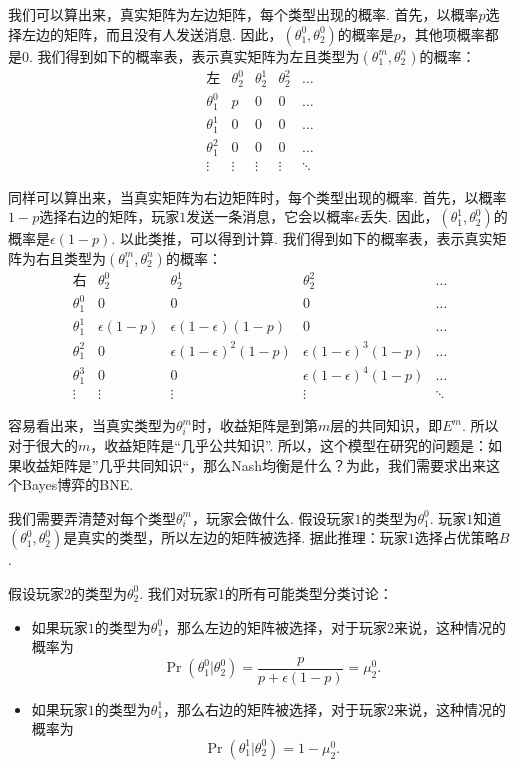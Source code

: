我们可以算出来，真实矩阵为左边矩阵，每个类型出现的概率. 首先，以概率$p$选择左边的矩阵，而且没有人发送消息. 因此，$(\theta_1^0,\theta_2^0)$的概率是$p$，其他项概率都是$0$. 我们得到如下的概率表，表示真实矩阵为左且类型为$(\theta_1^m,\theta_2^n)$的概率：
\[\begin{array}{c|cccc}
\text{左}& \theta_2^0 & \theta_2^1 & \theta_2^2 & \dots \\
\hline
\theta_1^0 & p & 0 & 0 & \dots \\
\theta_1^1 & 0 & 0 & 0 & \dots \\
\theta_1^2 & 0 & 0 & 0 & \dots \\
\vdots & \vdots & \vdots & \vdots & \ddots
\end{array}
\]

同样可以算出来，当真实矩阵为右边矩阵时，每个类型出现的概率. 首先，以概率$1 - p$选择右边的矩阵，玩家$1$发送一条消息，它会以概率$\epsilon$丢失. 因此，$(\theta_1^1,\theta_2^0)$的概率是$\epsilon(1 - p)$. 以此类推，可以得到计算. 我们得到如下的概率表，表示真实矩阵为右且类型为$(\theta_1^m,\theta_2^n)$的概率：
\[
\begin{array}{c|cccc}
\text{右} & \theta_2^0 & \theta_2^1 & \theta_2^2 & \dots \\
\hline
\theta_1^0 & 0 & 0 & 0 & \dots \\
\theta_1^1 & \epsilon(1 - p) & \epsilon(1 - \epsilon)(1 - p) & 0 & \dots \\
\theta_1^2 & 0 & \epsilon(1 - \epsilon)^2(1 - p) & \epsilon(1 - \epsilon)^3(1 - p) & \dots \\
\theta_1^3 & 0 & 0 & \epsilon(1 - \epsilon)^4(1 - p) & \dots \\
\vdots & \vdots & \vdots & \vdots & \ddots
\end{array}
\]


容易看出来，当真实类型为$\theta_i^m$时，收益矩阵是到第$m$层的共同知识，即$E^m$. 所以对于很大的$m$，收益矩阵是“几乎公共知识”. 所以，这个模型在研究的问题是：如果收益矩阵是”几乎共同知识“，那么Nash均衡是什么？为此，我们需要求出来这个Bayes博弈的BNE.

我们需要弄清楚对每个类型$\theta_i^m$，玩家会做什么. 假设玩家$1$的类型为$\theta_1^0$. 玩家$1$知道$(\theta_1^0,\theta_2^0)$是真实的类型，所以左边的矩阵被选择. 据此推理：玩家$1$选择占优策略$B$.

假设玩家$2$的类型为$\theta_2^0$. 我们对玩家$1$的所有可能类型分类讨论：
\begin{itemize}
    \item 如果玩家$1$的类型为$\theta_1^0$，那么左边的矩阵被选择，对于玩家$2$来说，这种情况的概率为
    \[\Pr(\theta_1^0|\theta_2^0) = \frac{p}{p+\epsilon(1-p)} = \mu_2^0.\] 
    \item 如果玩家$1$的类型为$\theta_1^1$，那么右边的矩阵被选择，对于玩家$2$来说，这种情况的概率为
    \[\Pr(\theta_1^1|\theta_2^0) = 1 - \mu_2^0.\]
\end{itemize}

